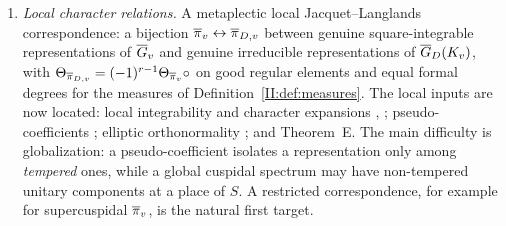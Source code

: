 \begin{enumerate}[label=(\roman*),start=2]
\item \emph{Local character relations.} A metaplectic local Jacquet--Langlands correspondence: a bijection $\overline{\pi}_v\leftrightarrow\overline{\pi}_{D,v}$ between genuine square-integrable representations of $\overline{G}_v$ and genuine irreducible representations of $\overline{G}_D(K_v)$, with $\Theta_{\overline{\pi}_{D,v}}=(-1)^{r-1}\Theta_{\overline{\pi}_v}\circ\relax$ on good regular elements and equal formal degrees for the measures of Definition~\ref{II:def:measures}. The local inputs are now located: local integrability and character expansions \cite[\S13]{FK86}, \cite[Th\'eor\`eme~4.3.2]{Li12}; pseudo-coefficients \cite[\S25.1]{FK86}; elliptic orthonormality \cite[\S25]{FK86}; and Theorem~E. The main difficulty is globalization: a pseudo-coefficient isolates a representation only among \emph{tempered} ones, while a global cuspidal spectrum may have non-tempered unitary components at a place of $S$. A restricted correspondence, for example for supercuspidal $\overline{\pi}_v$, is the natural first target.


\end{enumerate}
